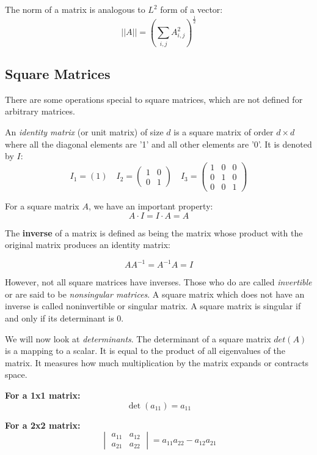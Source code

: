 The norm of a matrix is analogous to $L^{2}$ form of a vector:
\[
	||A|| = \left( \sum_{i,j} A_{i,j}^{2} \right)^{\frac{1}{2}}
\]

\subsection{Square Matrices}%
\label{subsec:label}

There are some operations special to square matrices, which are not defined for arbitrary matrices.

An \textit{identity matrix} (or unit matrix) of size $d$ is a square matrix of order $d \times d$ where all the diagonal elements are '1' and all other elements are '0'. It is denoted by $I$:
\[
	I_1 = (1) \quad
	I_2 = \begin{pmatrix} 1 & 0 \\ 0 & 1 \end{pmatrix} \quad
	I_3 = \begin{pmatrix} 1 & 0 & 0 \\ 0 & 1 & 0 \\ 0 & 0 & 1 \end{pmatrix}
\]

For a square matrix $A$, we have an important property:
\[
	A \cdot I = I \cdot A = A
\]

The \textbf{inverse} of a matrix is defined as being the matrix whose product with the original matrix produces an identity matrix:

\[
	AA^{-1} = A^{-1}A = I
\]

However, not all square matrices have inverses. Those who do are called \textit{invertible} or are said to be \textit{nonsingular matrices}. A square matrix which does not have an inverse is called noninvertible or singular matrix. A square matrix is singular if and only if its determinant is 0.

We will now look at \textit{determinants}. The determinant of a square matrix $det(A)$ is a mapping to a scalar. It is equal to the product of all eigenvalues of the matrix. It measures how much multiplication by the matrix expands or contracts space.

\noindent
\textbf{For a 1x1 matrix:}
\[
	\det(a_{11}) = a_{11}
\]

\noindent
\textbf{For a 2x2 matrix:}
\[
	\begin{vmatrix}
		a_{11} & a_{12} \\
		a_{21} & a_{22}
	\end{vmatrix}
	= a_{11}a_{22} - a_{12}a_{21}
\]

